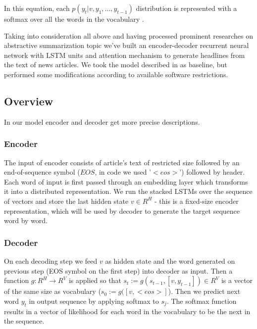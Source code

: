 In this equation, each $p(y_t|v, y_1, ..., y_{t-1})$ distribution is represented with a softmax over all the
words in the vocabulary \cite{seq2seq_with_NN}.

Taking into consideration all above and having processed prominent researches on abstractive summarization topic we've built an encoder-decoder recurrent neural network with LSTM units and attention mechanism to generate headlines from the text of news articles. We took the model described in \cite{model-baseline-article} as baseline, but performed some modifications according to available software restrictions.

\subsection{Overview}
In our model encoder and decoder get more precise descriptions.


\subsubsection{Encoder}
The input of encoder consists of article's text of restricted size followed by an end-of-sequence symbol ($EOS$, in code we used '$<eos>$') followed by header. Each word of input is first passed through an embedding layer which transforms it into a distributed representation.
We run the stacked LSTMs over the sequence of vectors and store the last hidden state $v \in R^H$ - this is a fixed-size encoder representation, which will be used by decoder to generate the target sequence word by word.   


\subsubsection{Decoder}
On each decoding step we feed $v$ as hidden state and the word generated on previous step (EOS symbol on the first step) into decoder as input.
Then a function $g: R^H \rightarrow R^V$ is applied so that $s_t := g(s_{t-1}, [v, y_{t-1}]) \in R^V$ is a vector of the same size as vocabulary ($s_0 := g([v, <eos>]$). Then we predict next word $y_t$ in output sequence by applying softmax to $s_j$. The softmax function results in a vector of likelihood for each word in the vocabulary to be the next in the sequence. 


